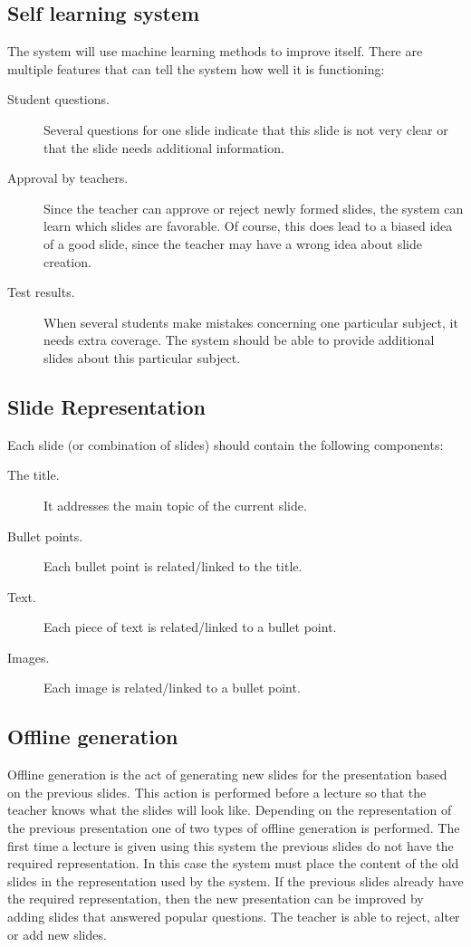 \documentclass[11pt]{article}
\begin{document}
\subsection{Self learning system}
The system will use machine learning methods to improve itself. There are multiple features that can tell the system how well it is functioning:
\begin{description}
\item[Student questions.] Several questions for one slide indicate that this slide is not very clear or that the slide needs additional information.
\item[Approval by teachers.] Since the teacher can approve or reject newly formed slides, the system can learn which slides are favorable. Of course, this does lead to a biased idea of a good slide, since the teacher may have a wrong idea about slide creation.
\item[Test results.] When several students make mistakes concerning one particular subject, it needs extra coverage. The system should be able to provide additional slides about this particular subject.
\end{description}

\subsection{Slide Representation}
Each slide (or combination of slides) should contain the following components:
\begin{description}
\item[The title.] It addresses the main topic of the current slide.
\item[Bullet points.] Each bullet point is related/linked to the title.
\item[Text.] Each piece of text is related/linked to a bullet point.
\item[Images.] Each image is related/linked to a bullet point.
\end{description}

\subsection{Offline generation}
Offline generation is the act of generating new slides for the presentation based on the previous slides. This action is performed before a lecture so that the teacher knows what the slides will look like. Depending on the representation of the previous presentation one of two types of offline generation is performed. The first time a lecture is given using this system the previous slides do not have the required representation. In this case the system must place the content of the old slides in the representation used by the system. If the previous slides already have the required representation, then the new presentation can be improved by adding slides that answered popular questions. The teacher is able to reject, alter or add new slides.
\end{document}
